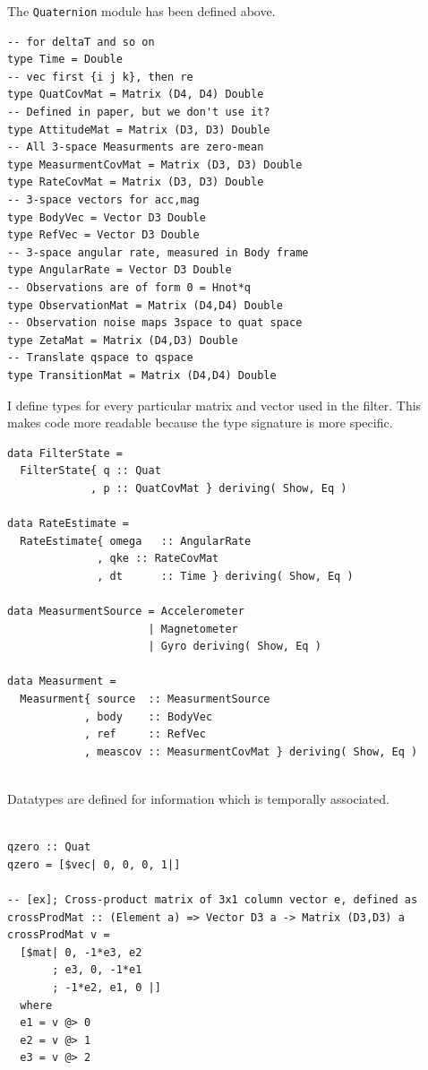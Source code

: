 \documentclass[12pt]{report}
\begin{document}
The \lstinline$Quaternion$ module has been defined above.

\begin{lstlisting}
-- for deltaT and so on
type Time = Double
-- vec first {i j k}, then re
type QuatCovMat = Matrix (D4, D4) Double
-- Defined in paper, but we don't use it?
type AttitudeMat = Matrix (D3, D3) Double
-- All 3-space Measurments are zero-mean
type MeasurmentCovMat = Matrix (D3, D3) Double
type RateCovMat = Matrix (D3, D3) Double
-- 3-space vectors for acc,mag
type BodyVec = Vector D3 Double
type RefVec = Vector D3 Double
-- 3-space angular rate, measured in Body frame
type AngularRate = Vector D3 Double
-- Observations are of form 0 = Hnot*q
type ObservationMat = Matrix (D4,D4) Double
-- Observation noise maps 3space to quat space
type ZetaMat = Matrix (D4,D3) Double
-- Translate qspace to qspace
type TransitionMat = Matrix (D4,D4) Double

\end{lstlisting}

I define types for every particular matrix and vector used in the filter. This makes code more readable because the type signature is more specific. 

\begin{lstlisting}
data FilterState = 
  FilterState{ q :: Quat
             , p :: QuatCovMat } deriving( Show, Eq )

data RateEstimate = 
  RateEstimate{ omega   :: AngularRate
              , qke :: RateCovMat
              , dt      :: Time } deriving( Show, Eq )

data MeasurmentSource = Accelerometer
                      | Magnetometer 
                      | Gyro deriving( Show, Eq )

data Measurment =
  Measurment{ source  :: MeasurmentSource
            , body    :: BodyVec
            , ref     :: RefVec
            , meascov :: MeasurmentCovMat } deriving( Show, Eq )


\end{lstlisting}

Datatypes are defined for information which is temporally associated.

\begin{lstlisting}

qzero :: Quat
qzero = [$vec| 0, 0, 0, 1|]

-- [ex]; Cross-product matrix of 3x1 column vector e, defined as
crossProdMat :: (Element a) => Vector D3 a -> Matrix (D3,D3) a
crossProdMat v = 
  [$mat| 0, -1*e3, e2 
       ; e3, 0, -1*e1 
       ; -1*e2, e1, 0 |]
  where 
  e1 = v @> 0
  e2 = v @> 1
  e3 = v @> 2

\end{lstlisting}
\end{document}
